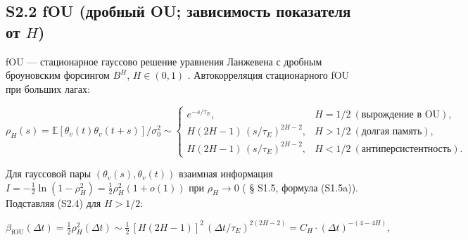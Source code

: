 \documentclass[12pt]{iopart}
\providecommand{\texorpdfstring}[2]{#1}
\begin{document}
\subsection{\texorpdfstring{S2.2 fOU (дробный OU; зависимость показателя от \(H\))}{S2.2 fOU (дробный OU; зависимость показателя от H)}}\label{s2.2-fou-ux434ux440ux43eux431ux43dux44bux439-ou-ux437ux430ux432ux438ux441ux438ux43cux43eux441ux442ux44c-ux43fux43eux43aux430ux437ux430ux442ux435ux43bux44f-ux43eux442-h}



fOU --- стационарное гауссово решение уравнения Ланжевена с дробным броуновским форсингом \(B^H\), \(H \in (0,1)\) \cite{Mandelbrot1968,Cheridito2003}. Автокорреляция стационарного fOU при больших лагах:



\begin{equation}\rho_H(s) = \mathbb{E}[\theta_v(t)\theta_v(t+s)]/\sigma_0^2 \sim \begin{cases} e^{-s/\tau_E}, & H = 1/2 \ (\text{вырождение в OU}),\\[2pt] H(2H-1)\,(s/\tau_E)^{2H-2}, & H > 1/2 \ (\text{долгая память}),\\[2pt] H(2H-1)\,(s/\tau_E)^{2H-2}, & H < 1/2 \ (\text{антиперсистентность}).\end{cases} \tag{S2.4}\end{equation}



Для гауссовой пары \((\theta_v(s),\theta_v(t))\) взаимная информация \(I = -\tfrac12\ln(1-\rho_H^2) = \tfrac12\rho_H^2(1+o(1))\) при \(\rho_H \to 0\) (\cite{Andriishin2026b} § S1.5, формула (S1.5a)). Подставляя (S2.4) для \(H > 1/2\):



\begin{equation}\beta_{\text{fOU}}(\Delta t) = \tfrac12\rho_H^2(\Delta t) \sim \tfrac12\,[H(2H-1)]^2\,(\Delta t/\tau_E)^{2(2H-2)} = C_H\cdot(\Delta t)^{-(4-4H)}, \tag{S2.5}\end{equation}
\end{document}
